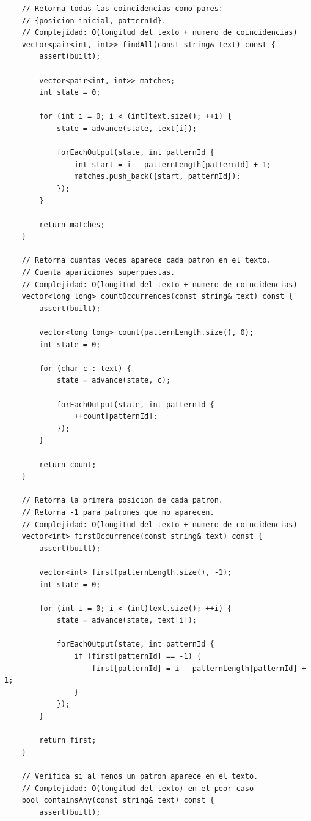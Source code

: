\begin{lstlisting}
    // Retorna todas las coincidencias como pares:
    // {posicion inicial, patternId}.
    // Complejidad: O(longitud del texto + numero de coincidencias)
    vector<pair<int, int>> findAll(const string& text) const {
        assert(built);

        vector<pair<int, int>> matches;
        int state = 0;

        for (int i = 0; i < (int)text.size(); ++i) {
            state = advance(state, text[i]);

            forEachOutput(state, int patternId {
                int start = i - patternLength[patternId] + 1;
                matches.push_back({start, patternId});
            });
        }

        return matches;
    }

    // Retorna cuantas veces aparece cada patron en el texto.
    // Cuenta apariciones superpuestas.
    // Complejidad: O(longitud del texto + numero de coincidencias)
    vector<long long> countOccurrences(const string& text) const {
        assert(built);

        vector<long long> count(patternLength.size(), 0);
        int state = 0;

        for (char c : text) {
            state = advance(state, c);

            forEachOutput(state, int patternId {
                ++count[patternId];
            });
        }

        return count;
    }

    // Retorna la primera posicion de cada patron.
    // Retorna -1 para patrones que no aparecen.
    // Complejidad: O(longitud del texto + numero de coincidencias)
    vector<int> firstOccurrence(const string& text) const {
        assert(built);

        vector<int> first(patternLength.size(), -1);
        int state = 0;

        for (int i = 0; i < (int)text.size(); ++i) {
            state = advance(state, text[i]);

            forEachOutput(state, int patternId {
                if (first[patternId] == -1) {
                    first[patternId] = i - patternLength[patternId] + 1;
                }
            });
        }

        return first;
    }

    // Verifica si al menos un patron aparece en el texto.
    // Complejidad: O(longitud del texto) en el peor caso
    bool containsAny(const string& text) const {
        assert(built);


\end{lstlisting}
